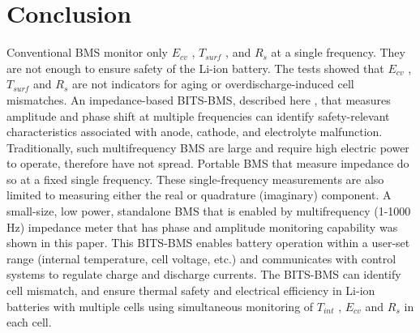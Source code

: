 \chapter{Conclusion}

Conventional BMS monitor only $E_{cv}$ , $T_{surf}$ , and $R_s$ at a single frequency. They are not enough to ensure safety of the Li-ion battery. The tests showed that $E_{cv}$ , $T_{surf}$ and $R_s$ are not indicators for aging or overdischarge-induced cell mismatches. An impedance-based BITS-BMS, described here \cite{8247206}, that measures amplitude and phase shift at multiple frequencies can identify safety-relevant characteristics associated with anode, cathode, and electrolyte malfunction. Traditionally, such multifrequency BMS are large and require high electric power to operate, therefore have not spread. Portable BMS that measure impedance do so at a fixed single frequency. These single-frequency measurements are also limited to measuring either the real or quadrature (imaginary) component. A small-size, low power, standalone BMS that is enabled by multifrequency (1-1000 Hz) impedance meter that has phase and amplitude monitoring capability was shown in this paper. This BITS-BMS enables battery operation within a user-set range (internal temperature, cell voltage, etc.) and communicates with control systems to regulate charge and discharge currents. The BITS-BMS can identify cell mismatch, and ensure thermal safety and electrical efficiency in Li-ion batteries with multiple cells using simultaneous monitoring of $T_{int}$ , $E_{cv}$ and $R_s$ in each cell.